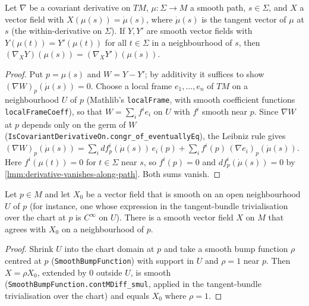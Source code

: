 \begin{lemma}
    \label{lmm:covariant-derivative-along-curve-local}
    \leanok
    Let $\nabla$ be a covariant derivative on $TM$, $\mu : \Sigma \to M$ a smooth path, $s \in \Sigma$, and $X$ a vector field with $X(\mu(s)) = \dot\mu(s)$, where $\dot\mu(s)$ is the tangent vector of $\mu$ at $s$ (the within-derivative on $\Sigma$). If $Y, Y'$ are smooth vector fields with $Y(\mu(t)) = Y'(\mu(t))$ for all $t \in \Sigma$ in a neighbourhood of $s$, then $(\nabla_X Y)(\mu(s)) = (\nabla_X Y')(\mu(s))$.
\end{lemma}
\begin{proof}
    \leanok
    Put $p = \mu(s)$ and $W = Y - Y'$; by additivity it suffices to show $(\nabla W)_p(\dot\mu(s)) = 0$. Choose a local frame $e_1, \dots, e_n$ of $TM$ on a neighbourhood $U$ of $p$ (Mathlib's \texttt{localFrame}, with smooth coefficient functions \texttt{localFrameCoeff}), so that $W = \sum_i f^i e_i$ on $U$ with $f^i$ smooth near $p$. Since $\nabla W$ at $p$ depends only on the germ of $W$ (\texttt{IsCovariantDerivativeOn.congr\_of\_eventuallyEq}), the Leibniz rule gives $(\nabla W)_p(\dot\mu(s)) = \sum_i df^i_p(\dot\mu(s))\,e_i(p) + \sum_i f^i(p)\,(\nabla e_i)_p(\dot\mu(s))$. Here $f^i(\mu(t)) = 0$ for $t \in \Sigma$ near $s$, so $f^i(p) = 0$ and $df^i_p(\dot\mu(s)) = 0$ by \ref{lmm:derivative-vanishes-along-path}. Both sums vanish.
\end{proof}

\begin{lemma}
    \label{lmm:local-vector-field-globalises}
    \leanok
    Let $p \in M$ and let $X_0$ be a vector field that is smooth on an open neighbourhood $U$ of $p$ (for instance, one whose expression in the tangent-bundle trivialisation over the chart at $p$ is $C^\infty$ on $U$). There is a smooth vector field $X$ on $M$ that agrees with $X_0$ on a neighbourhood of $p$.
\end{lemma}
\begin{proof}
    \leanok
    Shrink $U$ into the chart domain at $p$ and take a smooth bump function $\rho$ centred at $p$ (\texttt{SmoothBumpFunction}) with support in $U$ and $\rho = 1$ near $p$. Then $X = \rho X_0$, extended by $0$ outside $U$, is smooth (\texttt{SmoothBumpFunction.contMDiff\_smul}, applied in the tangent-bundle trivialisation over the chart) and equals $X_0$ where $\rho = 1$.
\end{proof}

